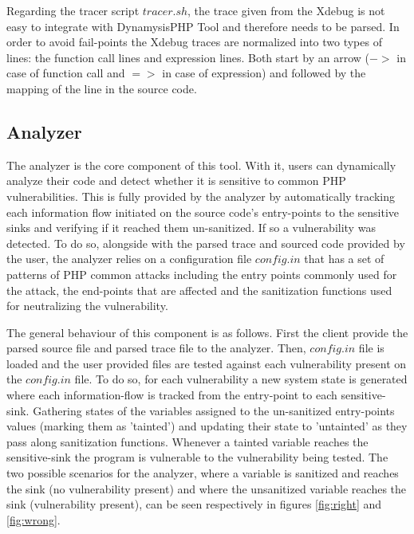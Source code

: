 \documentclass{./llncs2e/llncs}
\begin{document}
Regarding the tracer script $tracer.sh$, the trace given from the Xdebug is not easy to integrate with DynamysisPHP Tool and therefore needs to be parsed. In order to avoid fail-points the Xdebug traces are normalized into two types of lines: the function call lines and expression lines. Both start by an arrow ($->$ in case of function call and $=>$ in case of expression) and followed by the mapping of the line in the source code.

\subsection{Analyzer}  
The analyzer is the core component of this tool. With it, users can dynamically analyze their code and detect whether it is sensitive to common PHP vulnerabilities. This is fully provided by the analyzer by automatically tracking each information flow initiated on the source code's entry-points to the sensitive sinks and verifying if it reached them un-sanitized. If so a vulnerability was detected. To do so, alongside with the parsed trace and sourced code provided by the user, the analyzer relies on a configuration file $config.in$ that has a set of patterns of PHP common attacks including the entry points commonly used for the attack, the end-points that are affected and the sanitization functions used for neutralizing the vulnerability.

The general behaviour of this component is as follows. First the client provide the parsed source file and parsed trace file to the analyzer. Then, $config.in$ file is loaded and the user provided files are tested against each vulnerability present on the $config.in$ file. To do so, for each vulnerability a new system state is generated where each information-flow is tracked from the entry-point to each sensitive-sink. Gathering states of the variables assigned to the un-sanitized entry-points values (marking them as 'tainted') and updating their state to 'untainted' as they pass along sanitization functions. Whenever a tainted variable reaches the sensitive-sink the program is vulnerable to the vulnerability being tested. The two possible scenarios for the analyzer, where a variable is sanitized and reaches the sink (no vulnerability present) and where the unsanitized variable reaches the sink (vulnerability present), can be seen respectively in figures \ref{fig:right} and \ref{fig:wrong}.
\end{document}
